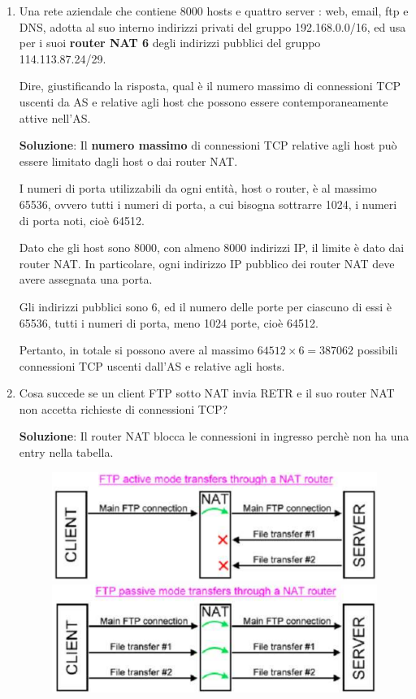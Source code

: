 \documentclass[11pt,a4paper,oneside]{book}
\theoremstyle{definition}
\begin{document}
\begin{enumerate}
	      \pagebreak

	\item Una rete aziendale che contiene 8000 hosts e quattro server : web, email, ftp e DNS, adotta al suo interno indirizzi privati del gruppo 192.168.0.0/16, ed usa per i suoi \textbf{router NAT 6} degli indirizzi pubblici del gruppo 114.113.87.24/29.

	      Dire, giustificando la risposta, qual è il numero massimo di connessioni TCP uscenti da AS e relative agli host che possono essere contemporaneamente attive nell’AS.


	      \textbf{Soluzione}:
	      Il \textbf{numero massimo} di connessioni TCP relative agli host può essere limitato dagli host o dai router NAT.

	      I numeri di porta utilizzabili da ogni entità, host o router, è al massimo 65536,
	      ovvero tutti i numeri di porta, a cui bisogna sottrarre 1024, i numeri di porta noti, cioè 64512.

	      Dato che gli host sono 8000, con almeno 8000 indirizzi IP, il limite è dato dai router NAT. In particolare, ogni indirizzo IP pubblico dei router NAT deve avere assegnata una porta.

	      Gli indirizzi pubblici sono 6, ed il numero delle porte per ciascuno di essi è
	      65536, tutti i numeri di porta, meno 1024 porte, cioè 64512.

	      Pertanto, in totale si possono avere al massimo $64512 \times 6 = 387062$ possibili connessioni TCP uscenti dall'AS e relative agli hosts.
	      \label{sec:NATproblems}
	\item Cosa succede se un client FTP sotto NAT invia
	      RETR e il suo router NAT non accetta richieste di connessioni TCP?

	      \textbf{Soluzione}: Il router NAT blocca le connessioni in ingresso
	      perchè non ha una entry nella tabella.

	      \begin{figure}[!h]
		      \includegraphics[scale=0.4]{Immagini/Natp.png}
		      \includegraphics[scale=0.31]{Immagini/Natp1.png}
		      \centering
	      \end{figure}


\end{enumerate}
\end{document}
